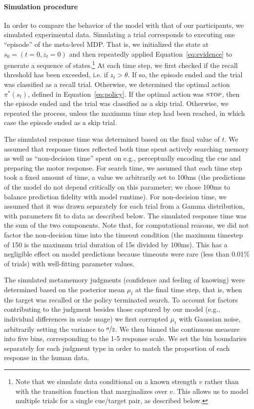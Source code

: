 \paragraph{Simulation procedure}
In order to compare the behavior of the model with that of our participants, we simulated experimental data. Simulating a trial corresponds to executing one ``episode'' of the meta-level MDP. That is, we initialized the state at $s_0 = (t=0, z_t = 0)$ and then repeatedly applied Equation~\ref{eq:evidence} to generate a sequence of states.\footnote{Note that we simulate data conditional on a known strength $v$ rather than with the transition function that marginalizes over $v$. This allows us to model multiple trials for a single cue/target pair, as described below.} At each time step, we first checked if the recall threshold has been exceeded, i.e. if $z_t > \theta$. If so, the episode ended and the trial was classified as a recall trial. Otherwise, we determined the optimal action $\pi^*(s_t)$, defined in Equation~\ref{eq:policy}. If the optimal action was $\textsc{stop}$, then the episode ended and the trial was classified as a skip trial. Otherwise, we repeated the process, unless the maximum time step had been reached, in which case the episode ended as a skip trial.

The simulated response time was determined based on the final value of $t$. We assumed that response times reflected both time spent actively searching memory as well as ``non-decision time'' spent on e.g., perceptually encoding the cue and preparing the motor response. For search time, we assumed that each time step took a fixed amount of time, a value we arbitrarily set to 100ms (the predictions of the model do not depend critically on this parameter; we chose 100ms to balance prediction fidelity with model runtime). For non-decision time, we assumed that it was drawn separately for each trial from a Gamma distribution, with parameters fit to data as described below. The simulated response time was the sum of the two components. Note that, for computational reasons, we did not factor the non-decision time into the timeout condition (the maximum timestep of 150 is the maximum trial duration of 15s divided by 100ms). This has a negligible effect on model predictions because timeouts were rare (less than 0.01\% of trials) with well-fitting parameter values.

The simulated metamemory judgments (confidence and feeling of knowing) were determined based on the posterior mean $\mu_t$ at the final time step, that is, when the target was recalled or the policy terminated search. To account for factors contributing to the judgment besides those captured by our model (e.g., individual differences in scale usage) we first corrupted $\mu_t$ with Gaussian noise, arbitrarily setting the variance to $\nicefrac{\sigma}{2}$. We then binned the continuous measure into five bins, corresponding to the 1-5 response scale. We set the bin boundaries separately for each judgment type in order to match the proportion of each response in the human data.

